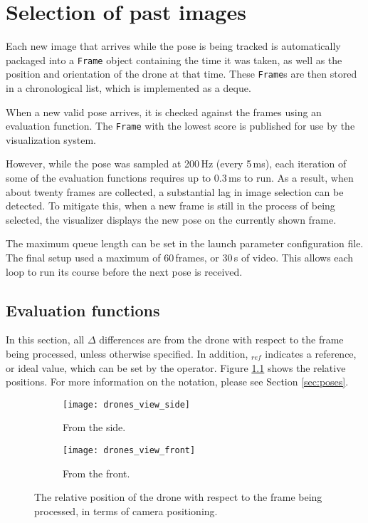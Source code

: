 \chapter{Selection of past images}
    Each new image that arrives while the pose is being tracked is automatically packaged into a \texttt{Frame} object containing the time it was taken, as well as the position and orientation of the drone at that time.
    These \texttt{Frame}s are then stored in a chronological list, which is implemented as a deque.

    When a new valid pose arrives, it is checked against the frames using an evaluation function.
    The \texttt{Frame} with the lowest score is published for use by the visualization system.

    However, while the pose was sampled at 200\,Hz (every 5\,ms), each iteration of some of the evaluation functions requires up to 0.3\,ms to run.
    As a result, when about twenty frames are collected, a substantial lag in image selection can be detected.
    To mitigate this, when a new frame is still in the process of being selected, the visualizer displays the new pose on the currently shown frame.

    The maximum queue length can be set in the launch parameter configuration file.
    The final setup used a maximum of 60\,frames, or 30\,s of video.
    This allows each loop to run its course before the next pose is received.

  \section{Evaluation functions}
    In this section, all $\Delta$ differences are from the drone with respect to the frame being processed, unless otherwise specified.
    In addition, $_{ref}$ indicates a reference, or ideal value, which can be set by the operator.
    Figure \ref{fig:drones_view} shows the relative positions. For more information on the notation, please see Section \ref{sec:poses}.

    \begin{figure}[h]
      \centering
      \begin{subfigure}[b]{0.45\textwidth}
	\texttt{[image: drones\_view\_side]}
	\caption{From the side.}
      \end{subfigure}
      \hfill
      \begin{subfigure}[b]{0.45\textwidth}
	\texttt{[image: drones\_view\_front]}
	\caption{From the front.}
      \end{subfigure}
      \caption[Relative positions]{The relative position of the drone with respect to the frame being processed, in terms of camera positioning.}
      \label{fig:drones_view}
    \end{figure}

